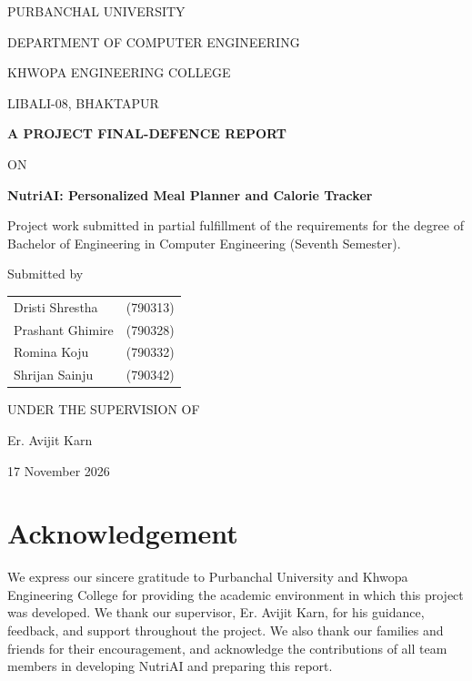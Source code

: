 \documentclass[12pt,a4paper]{report}
\begin{document}
\begin{titlepage}
\centering
{\Large PURBANCHAL UNIVERSITY\par}
\vspace{1.1cm}
{\large DEPARTMENT OF COMPUTER ENGINEERING\par}
{\large KHWOPA ENGINEERING COLLEGE\par}
{\normalsize LIBALI-08, BHAKTAPUR\par}
\vspace{1.5cm}
{\Large\bfseries A PROJECT FINAL-DEFENCE REPORT\par}
\vspace{0.4cm}
{\large ON\par}
\vspace{0.35cm}
{\LARGE\bfseries NutriAI: Personalized Meal Planner and Calorie Tracker\par}
\vspace{1cm}
\begin{minipage}{0.86\textwidth}
\centering
Project work submitted in partial fulfillment of the requirements for the degree of
Bachelor of Engineering in Computer Engineering (Seventh Semester).
\end{minipage}
\vfill
{\large Submitted by\par}
\vspace{0.3cm}
\begin{tabular}{lr}
Dristi Shrestha & (790313)\\
Prashant Ghimire & (790328)\\
Romina Koju & (790332)\\
Shrijan Sainju & (790342)
\end{tabular}
\vspace{1cm}

{\large UNDER THE SUPERVISION OF\par}
{\large Er. Avijit Karn\par}
\vfill
{\large 17 November 2026\par}
\end{titlepage}

\chapter*{Acknowledgement}
We express our sincere gratitude to Purbanchal University and Khwopa Engineering
College for providing the academic environment in which this project was developed.
We thank our supervisor, Er. Avijit Karn, for his guidance, feedback, and support
throughout the project. We also thank our families and friends for their encouragement,
and acknowledge the contributions of all team members in developing NutriAI and
preparing this report.
\end{document}
